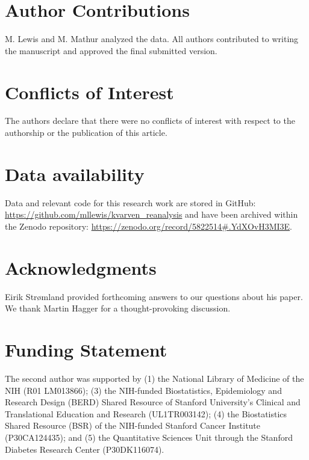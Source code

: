 \documentclass[man,floatsintext]{apa7}
\begin{document}
\nocite{kvarven2020comparing} 

\section{Author Contributions}
\noindent M. Lewis and M. Mathur analyzed the data. All authors contributed to writing the manuscript and  approved the final submitted version.


\section{Conflicts of Interest}
\noindent The authors declare that there were no conflicts of interest with respect to the authorship or the publication of this article.

\section{Data availability}
\noindent Data and relevant code for this research work are stored in GitHub: \href{https://github.com/mllewis/kvarven\_reanalysis} {https://github.com/mllewis/kvarven\_reanalysis} and have been archived within the Zenodo repository: \href{https://zenodo.org/record/5822514#.YdXOvH3MI3E} {https://zenodo.org/record/5822514#.YdXOvH3MI3E}. 


\section{Acknowledgments} 
\noindent Eirik Str{\o}mland provided forthcoming answers to our questions about his paper. We thank Martin Hagger for a thought-provoking discussion.

\section{Funding Statement } 
\noindent The second author was supported by (1) the National Library of Medicine of the NIH (R01 LM013866); (3) the NIH-funded Biostatistics,
Epidemiology and Research Design (BERD) Shared Resource of Stanford University's Clinical and Translational Education and Research (UL1TR003142); (4) the Biostatistics Shared Resource (BSR) of the NIH-funded Stanford Cancer Institute (P30CA124435); and (5) the Quantitative Sciences Unit through the Stanford Diabetes Research Center (P30DK116074).

\newpage



\pagebreak

\printbibliography
\end{document}
